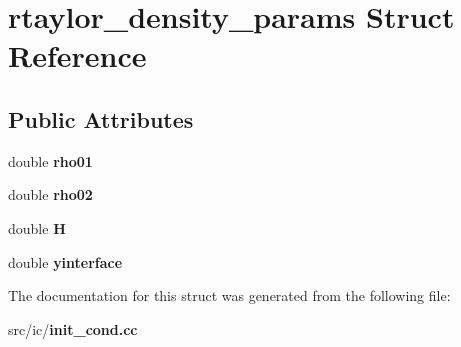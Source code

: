 \section{rtaylor\-\_\-density\-\_\-params Struct Reference}
\label{structrtaylor__density__params}
\subsection*{Public Attributes}
\begin{DoxyCompactItemize}
\item 
double {\bfseries rho01}\label{structrtaylor__density__params_af9c0cb1d869924bdd3efd65ed8aacaa4}

\item 
double {\bfseries rho02}\label{structrtaylor__density__params_ab5d8c429efdbc6fd961ca0ade8a620a0}

\item 
double {\bfseries H}\label{structrtaylor__density__params_ad416dff05bca11a2e11a6394f7d0cbd6}

\item 
double {\bfseries yinterface}\label{structrtaylor__density__params_aaa352e4f4f22c32b2bf630d82da72e56}

\end{DoxyCompactItemize}


The documentation for this struct was generated from the following file\-:\begin{DoxyCompactItemize}
\item 
src/ic/{\bf init\-\_\-cond.\-cc}\end{DoxyCompactItemize}
